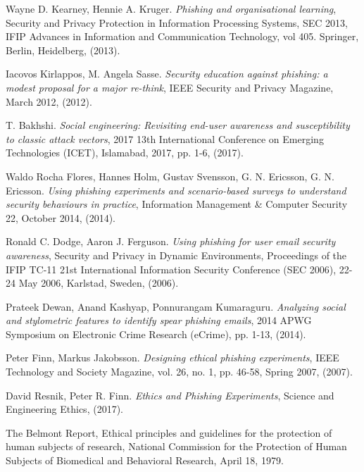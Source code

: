 \documentclass[a4paper]{article}
\begin{document}
\begin{thebibliography}{1}
Wayne D. Kearney, Hennie A. Kruger. \emph{Phishing and organisational learning}, Security and Privacy Protection in Information Processing Systems, SEC 2013, IFIP Advances in Information and Communication Technology, vol 405. Springer, Berlin, Heidelberg, (2013).

Iacovos Kirlappos, M. Angela Sasse. \emph{Security education against phishing: a modest proposal for a major re-think}, IEEE Security and Privacy Magazine, March 2012, (2012).

T. Bakhshi. \emph{Social engineering: Revisiting end-user awareness and susceptibility to classic attack vectors}, 2017 13th International Conference on Emerging Technologies (ICET), Islamabad, 2017, pp. 1-6, (2017).

Waldo Rocha Flores, Hannes Holm, Gustav Svensson, G. N. Ericsson, G. N. Ericsson. \emph{Using phishing experiments and scenario-based surveys to understand security behaviours in practice}, Information Management \& Computer Security 22, October 2014, (2014).

Ronald C. Dodge, Aaron J. Ferguson. \emph{Using phishing for user email security awareness}, Security and Privacy in Dynamic Environments, Proceedings of the IFIP TC-11 21st International Information Security Conference (SEC 2006), 22-24 May 2006, Karlstad, Sweden, (2006).


Prateek Dewan, Anand Kashyap, Ponnurangam Kumaraguru. \emph{Analyzing social and stylometric features to identify spear phishing emails}, 2014 APWG Symposium on Electronic Crime Research (eCrime), pp. 1-13, (2014).

Peter Finn, Markus Jakobsson. \emph{Designing ethical phishing experiments}, IEEE Technology and Society Magazine, vol. 26, no. 1, pp. 46-58, Spring 2007, (2007).

David Resnik, Peter R. Finn. \emph{Ethics and Phishing Experiments}, Science and Engineering Ethics, (2017).

The Belmont Report, Ethical principles and guidelines for the protection of human subjects of research, National Commission for the Protection of Human Subjects of Biomedical and Behavioral Research, April 18, 1979.


\end{thebibliography}
\end{document}
